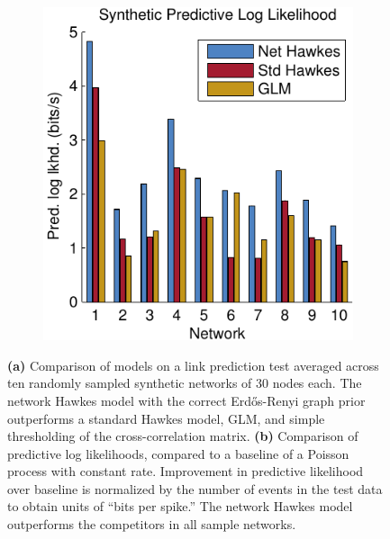 \begin{figure}[t]
\begin{center}
\begin{subfigure}[T]{.4\textwidth}
    \includegraphics[width=\textwidth]{figures/ch2/synth_pred_ll}
    \label{fig:synth_pred_ll}
  \end{subfigure}
  \end{center}
  \vspace{-1em}
  \caption[Synthetic link prediction and predictive log likelihood]{
    \textbf{(a)} Comparison of models on a link prediction test averaged across ten randomly sampled synthetic networks of 30 nodes each. The network Hawkes model with the correct Erd\H{o}s-Renyi graph prior outperforms a standard Hawkes model, GLM, and simple thresholding of the cross-correlation matrix.
    \textbf{(b)} Comparison of predictive log likelihoods, compared to a baseline of a Poisson process with constant rate. Improvement in predictive likelihood over baseline is normalized by the number of events in the test data to obtain units of ``bits per spike.'' The network Hawkes model outperforms the competitors in all sample networks.}
\vspace{-1.5em}
\end{figure}

